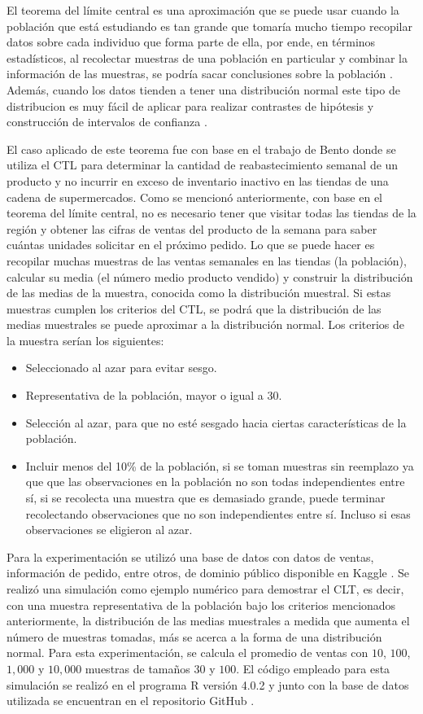 \documentclass{article}
\begin{document}
El teorema del límite central es una aproximación que se puede usar cuando la población que está estudiando es tan grande que tomaría mucho tiempo recopilar datos sobre cada individuo que forma parte de ella, por ende, en términos estadísticos, al recolectar muestras de una población en particular y combinar la información de las muestras, se podría sacar conclusiones sobre la población \cite{Bento}. Además, cuando los datos tienden a tener una distribución normal este tipo de distribucion es muy fácil de aplicar para realizar contrastes de hipótesis y construcción de intervalos de confianza \cite{Lopez}.

El caso aplicado de este teorema fue con base en el trabajo de Bento \cite{Bento} donde se utiliza el CTL para determinar la cantidad de reabastecimiento semanal de un producto y no incurrir en exceso de inventario inactivo en las tiendas de una cadena de supermercados. Como se mencionó anteriormente, con base en el teorema del límite central, no es necesario tener que visitar todas las tiendas de la región y obtener las cifras de ventas del producto de la semana para saber cuántas unidades solicitar en el próximo pedido. Lo que se puede hacer es recopilar muchas muestras de las ventas semanales en las tiendas (la población), calcular su media (el número medio producto vendido) y construir la distribución de las medias de la muestra, conocida como la distribución muestral. Si estas muestras cumplen los criterios del CTL, se podrá que la distribución de las medias muestrales se puede aproximar a la distribución normal. Los criterios de la muestra serían los siguientes:

\begin{itemize}
    \item Seleccionado al azar para evitar sesgo.
    \item Representativa de la población, mayor o igual a $30$.
    \item Selección al azar, para que no esté sesgado hacia ciertas características de la población.
    \item Incluir menos del 10\% de la población, si se toman muestras sin reemplazo ya que que las observaciones en la población no son todas independientes entre sí, si se recolecta una muestra que es demasiado grande, puede terminar recolectando observaciones que no son independientes entre sí. Incluso si esas observaciones se eligieron al azar.
\end{itemize}

Para la experimentación se utilizó una base de datos con datos de ventas, información de pedido, entre otros, de dominio público disponible en Kaggle \cite{kaggle}. 
Se realizó una simulación como ejemplo numérico para demostrar el CLT, es decir, con una muestra representativa de la población bajo los criterios mencionados anteriormente, la distribución de las medias muestrales a medida que aumenta el número de muestras tomadas, más se acerca a la forma de una distribución normal. Para esta experimentación, se calcula el promedio de ventas con $10$, $100$, $1,000$ y $10,000$ muestras de tamaños $30$ y $100$. El código empleado para esta simulación se realizó en el programa R versión 4.0.2 \cite{r} y junto con la base de datos utilizada se encuentran en el repositorio GitHub \cite{github}.
\end{document}

